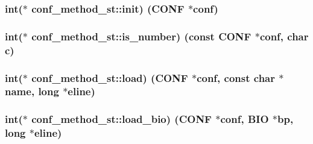 \subsubsection[{\texorpdfstring{init}{init}}]{\setlength{\rightskip}{0pt plus 5cm}int($\ast$ conf\+\_\+method\+\_\+st\+::init) ({\bf C\+O\+NF} $\ast$conf)}\hypertarget{structconf__method__st_af4c92d4cdeff7ceecd0b523201722c1c}{}\label{structconf__method__st_af4c92d4cdeff7ceecd0b523201722c1c}
\subsubsection[{\texorpdfstring{is\+\_\+number}{is_number}}]{\setlength{\rightskip}{0pt plus 5cm}int($\ast$ conf\+\_\+method\+\_\+st\+::is\+\_\+number) (const {\bf C\+O\+NF} $\ast$conf, char c)}\hypertarget{structconf__method__st_a696db4ab9f125a3ccd0c12da8a182cb0}{}\label{structconf__method__st_a696db4ab9f125a3ccd0c12da8a182cb0}
\subsubsection[{\texorpdfstring{load}{load}}]{\setlength{\rightskip}{0pt plus 5cm}int($\ast$ conf\+\_\+method\+\_\+st\+::load) ({\bf C\+O\+NF} $\ast$conf, const char $\ast${\bf name}, long $\ast${\bf eline})}\hypertarget{structconf__method__st_a27a9c46f51b45cebe7401e2e0d2beb3c}{}\label{structconf__method__st_a27a9c46f51b45cebe7401e2e0d2beb3c}
\subsubsection[{\texorpdfstring{load\+\_\+bio}{load_bio}}]{\setlength{\rightskip}{0pt plus 5cm}int($\ast$ conf\+\_\+method\+\_\+st\+::load\+\_\+bio) ({\bf C\+O\+NF} $\ast$conf, {\bf B\+IO} $\ast${\bf bp}, long $\ast${\bf eline})}\hypertarget{structconf__method__st_a2a0369109a541d85263dc5ce24060a1a}{}\label{structconf__method__st_a2a0369109a541d85263dc5ce24060a1a}
